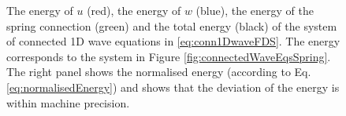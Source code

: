\begin{figure}[h]
    \centering
      \caption{The energy of $u$ (red), the energy of $w$ (blue), the energy of the spring connection (green) and the total energy (black) of the system of connected 1D wave equations in \eqref{eq:conn1DwaveFDS}. The energy corresponds to the system in Figure \ref{fig:connectedWaveEqsSpring}. The right panel shows the normalised energy (according to Eq. \eqref{eq:normalisedEnergy}) and shows that the deviation of the energy is within machine precision. \label{fig:energyConn1DWaveSpring}}
\end{figure}

